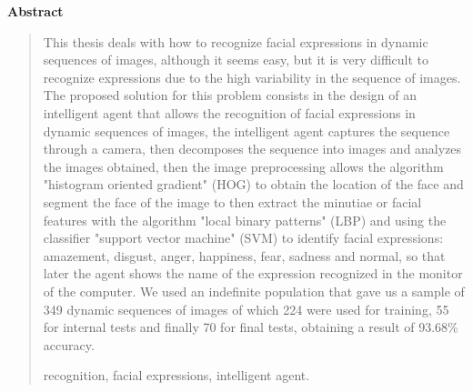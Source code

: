 \newpage
\begin{center}
 {\bf\LARGE Abstract}\vskip 1.5cm
\end{center} 
\begin{quotation}

This thesis deals with how to recognize facial expressions in dynamic sequences of images, although it seems easy, but it is very difficult to recognize expressions due to the high variability in the sequence of images. The proposed solution for this problem consists in the design of an intelligent agent that allows the recognition of facial expressions in dynamic sequences of images, the intelligent agent captures the sequence through a camera, then decomposes the sequence into images and analyzes the images obtained, then the image preprocessing allows the algorithm "histogram oriented gradient" (HOG) to obtain the location of the face and segment the face of the image to then extract the minutiae or facial features with the algorithm "local binary patterns" (LBP) and using the classifier "support vector machine" (SVM) to identify facial expressions: amazement, disgust, anger, happiness, fear, sadness and normal, so that later the agent shows the name of the expression recognized in the monitor of the computer. We used an indefinite population that gave us a sample of 349 dynamic sequences of images of which 224 were used for training, 55 for internal tests and finally 70 for final tests, obtaining a result of 93.68\% accuracy.


\vskip 0.3cm
\hspace*{-0.6cm}{\bf Keywords:} recognition, facial expressions, intelligent agent.
\end{quotation}

